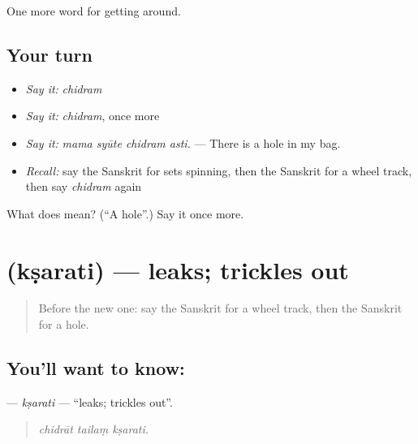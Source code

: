 \begin{grammarlens}[title={What you've built}]
One more word for getting around.
\end{grammarlens}

\subsection*{Your turn}
\begin{itemize}
\raggedright
  \item \emph{Say it:} \emph{chidram}
  \item \emph{Say it:} \emph{chidram}, once more
  \item \emph{Say it:} \emph{mama syūte chidram asti.} — There is a hole in my bag.
  \item \emph{Recall:} say the Sanskrit for sets spinning, then the Sanskrit for a wheel track, then say \emph{chidram} again
\end{itemize}

\begin{tcolorbox}[breakable,colback=teal!4,colframe=teal!35!black,title={Before you move on}]
What does  mean? (\textquotedblleft{}A hole\textquotedblright{}.) Say it once more.
\end{tcolorbox}
\section[\texorpdfstring{\sk{क्षरति} (kṣarati)}{क्षरति (kṣarati)}]{ (kṣarati) — leaks; trickles out}

\label{lesson:SA-C410-ksarati}



\begin{quote}
Before the new one: say the Sanskrit for a wheel track, then the Sanskrit for a hole.
\end{quote}

\subsection*{You'll want to know: }
\textbf{} — \emph{kṣarati} — \textquotedblleft{}leaks; trickles out\textquotedblright{}.

\begin{quote}
  
\end{quote}

\begin{quote}
\emph{chidrāt tailaṃ kṣarati.}
\end{quote}

